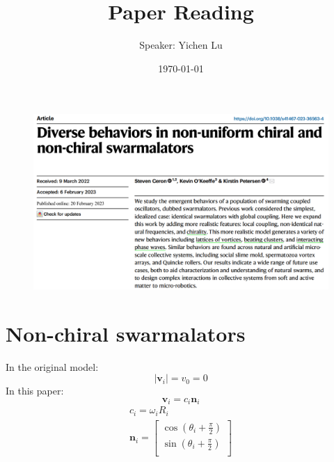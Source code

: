 \documentclass[10pt,aspectratio=43,mathserif,table]{beamer}
\title{Paper Reading}
\author{Speaker: Yichen Lu\quad \newline  \newline \quad }
\institute{\fontsize{8pt}{14pt}}
\date{\today}
\begin{document}

\begin{frame}
    \begin{figure}
        \centering
        \includegraphics[width=\textwidth]{title.jpg}
    \end{figure}
\end{frame}

\section{Non-chiral swarmalators}

\begin{frame}
    In the original model:
        $$|\mathbf{v}_i|=v_0=0$$
    In this paper:
        $$
        \mathbf{v}_i=c_i \mathbf{n}_i
        $$
        $$
        \begin{array}{c}
            c_i=\omega _iR_i\\
            \mathbf{n}_i=\left[ \begin{array}{c}
            \cos \left( \theta _i+\frac{\pi}{2} \right)\\
            \sin \left( \theta _i+\frac{\pi}{2} \right)\\
        \end{array} \right]\\
        \end{array}
        $$

\end{frame}
\end{document}
